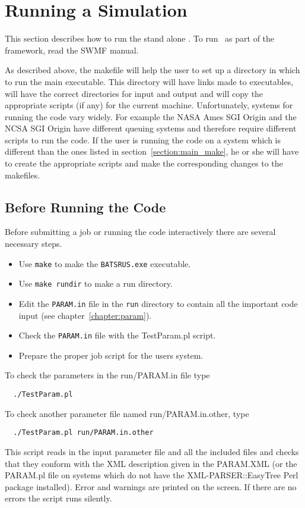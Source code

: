 \section{Running a Simulation \label{section:running}}

This section describes how to run the stand alone \BATSRUS. 
To run \BATSRUS\ as part of the framework, read the SWMF manual.

As described above, the makefile will help the user to set up a directory
in which to run the main executable.  This directory will have links made to
executables, will have the correct directories for input and output
and will copy the appropriate scripts (if any) for the current machine.
Unfortunately, systems for running the code vary widely.  For example the NASA
Ames SGI Origin and the NCSA SGI Origin have different queuing systems
and therefore require different scripts to run the code. If the
user is running the code on a system which is different than the 
ones listed in section~\ref{section:main_make}, 
he or she will have to create the appropriate
scripts and make the corresponding changes to the makefiles.

\subsection{Before Running the Code \label{section:before_running}}

Before submitting a job or running the code interactively there are
several necessary steps.
\begin{itemize}
\item Use {\tt make} to make the {\tt BATSRUS.exe} executable.
\item Use {\tt make rundir} to make a run directory.
\item Edit the {\tt PARAM.in} file in the {\tt run} directory to contain
      all the important code input (see chapter~\ref{chapter:param}).
\item Check the {\tt PARAM.in} file with the TestParam.pl script.
\item Prepare the proper job script for the users system.
\end{itemize}
To check the parameters in the run/PARAM.in file type
\begin{verbatim}
  ./TestParam.pl
\end{verbatim}
To check another parameter file named run/PARAM.in.other, 
type
\begin{verbatim}
  ./TestParam.pl run/PARAM.in.other
\end{verbatim}
This script reads in the input parameter file and all the
included files and checks that they conform with the 
XML description given in the PARAM.XML 
(or the PARAM.pl file on systems which do not have the 
XML-PARSER::EasyTree Perl package installed).
Error and warnings are printed on the screen. 
If there are no errors the script runs silently.

